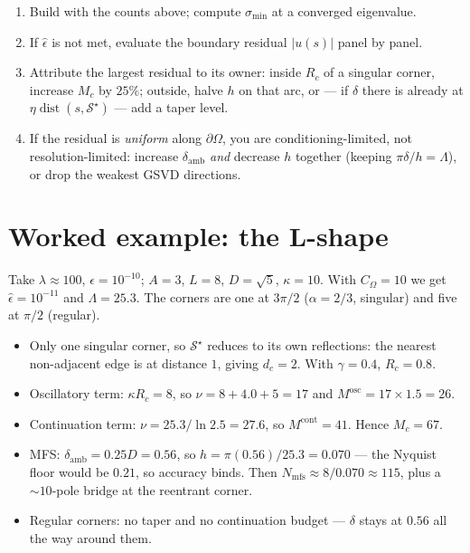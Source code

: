 \documentclass[11pt]{article}
\newcommand{\dist}{\operatorname{dist}}
\newcommand{\Sstar}{\mathcal{S}^\star}
\begin{document}
\begin{enumerate}[leftmargin=1.8em]
\item Build with the counts above; compute $\sigma_{\min}$ at a converged eigenvalue.
\item If $\hat\epsilon$ is not met, evaluate the boundary residual $|u(s)|$ panel by
  panel.
\item Attribute the largest residual to its owner: inside $R_c$ of a singular corner,
  increase $M_c$ by $25\%$; outside, halve $h$ on that arc, or --- if $\delta$ there is
  already at $\eta\dist(s,\Sstar)$ --- add a taper level.
\item If the residual is \emph{uniform} along $\partial\Omega$, you are
  conditioning-limited, not resolution-limited: increase $\delta_{\mathrm{amb}}$
  \emph{and} decrease $h$ together (keeping $\pi\delta/h=\Lambda$), or drop the weakest
  GSVD directions.
\end{enumerate}

\section{Worked example: the L-shape}
\label{sec:example}

Take $\lambda\approx100$, $\epsilon=10^{-10}$; $A=3$, $L=8$, $D=\sqrt5$, $\kappa=10$.
With $C_\Omega=10$ we get $\hat\epsilon=10^{-11}$ and $\Lambda=25.3$. The corners are
one at $3\pi/2$ ($\alpha=2/3$, singular) and five at $\pi/2$ (regular).

\begin{itemize}[leftmargin=1.4em]
\item Only one singular corner, so $\Sstar$ reduces to its own reflections: the
  nearest non-adjacent edge is at distance $1$, giving $d_c=2$. With $\gamma=0.4$,
  $R_c=0.8$.
\item Oscillatory term: $\kappa R_c=8$, so $\nu=8+4.0+5=17$ and
  $M^{\mathrm{osc}}=17\times1.5=26$.
\item Continuation term: $\nu=25.3/\ln 2.5=27.6$, so $M^{\mathrm{cont}}=41$. Hence
  $M_c=67$.
\item MFS: $\delta_{\mathrm{amb}}=0.25D=0.56$, so $h=\pi(0.56)/25.3=0.070$ --- the
  Nyquist floor would be $0.21$, so accuracy binds. Then
  $N_{\mathrm{mfs}}\approx 8/0.070\approx115$, plus a $\sim10$-pole bridge at the
  reentrant corner.
\item Regular corners: no taper and no continuation budget --- $\delta$ stays at
  $0.56$ all the way around them.
\end{itemize}
\end{document}
